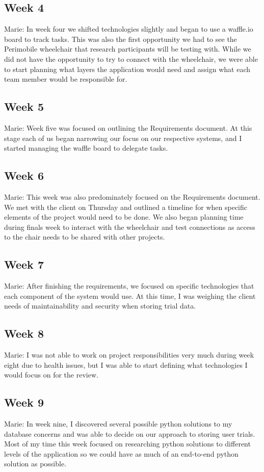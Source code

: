 \documentclass[onecolumn, draftclsnofoot,10pt, compsoc]{IEEEtran}
\begin{document}
\subsection{Week 4}
Marie: In week four we shifted technologies slightly and began to use a waffle.io board to track tasks. This was also the first opportunity we had to see the Perimobile wheelchair that research participants will be testing with. While we did not have the opportunity to try to connect with the wheelchair, we were able to start planning what layers the application would need and assign what each team member would be responsible for. 


\subsection{Week 5}
Marie: Week five was focused on outlining the Requirements document. At this stage each of us began narrowing our focus on our respective systems, and I started managing the waffle board to delegate tasks.

\subsection{Week 6}
Marie: This week was also predominately focused on the Requirements document. We met with the client on Thursday and outlined a timeline for when specific elements of the project would need to be done. We also began planning time during finals week to interact with the wheelchair and test connections as access to the chair needs to be shared with other projects.

\subsection{Week 7}
Marie: After finishing the requirements, we focused on specific technologies that each component of the system would use. At this time, I was weighing the client needs of maintainability and security when storing trial data.

\subsection{Week 8}
Marie: I was not able to work on project responsibilities very much during week eight due to health issues, but I was able to start defining what technologies I would focus on for the review.

\subsection{Week 9}
Marie: In week nine, I discovered several possible python solutions to my database concerns and was able to decide on our approach to storing user trials. Most of my time this week focused on researching python solutions to different levels of the application so we could have as much of an end-to-end python solution as possible. 
\end{document}
